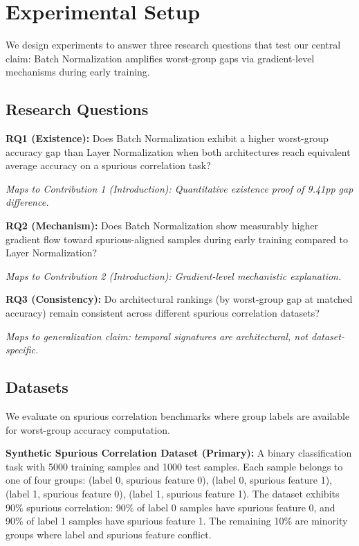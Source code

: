 \section{Experimental Setup}

We design experiments to answer three research questions that test our central claim: Batch Normalization amplifies worst-group gaps via gradient-level mechanisms during early training.

\subsection{Research Questions}

\textbf{RQ1 (Existence):} Does Batch Normalization exhibit a higher worst-group accuracy gap than Layer Normalization when both architectures reach equivalent average accuracy on a spurious correlation task?

\emph{Maps to Contribution 1 (Introduction): Quantitative existence proof of 9.41pp gap difference.}

\textbf{RQ2 (Mechanism):} Does Batch Normalization show measurably higher gradient flow toward spurious-aligned samples during early training compared to Layer Normalization?

\emph{Maps to Contribution 2 (Introduction): Gradient-level mechanistic explanation.}

\textbf{RQ3 (Consistency):} Do architectural rankings (by worst-group gap at matched accuracy) remain consistent across different spurious correlation datasets?

\emph{Maps to generalization claim: temporal signatures are architectural, not dataset-specific.}

\subsection{Datasets}

We evaluate on spurious correlation benchmarks where group labels are available for worst-group accuracy computation.

\textbf{Synthetic Spurious Correlation Dataset (Primary):}
A binary classification task with 5000 training samples and 1000 test samples. Each sample belongs to one of four groups: (label 0, spurious feature 0), (label 0, spurious feature 1), (label 1, spurious feature 0), (label 1, spurious feature 1). The dataset exhibits 90\% spurious correlation: 90\% of label 0 samples have spurious feature 0, and 90\% of label 1 samples have spurious feature 1. The remaining 10\% are minority groups where label and spurious feature conflict.


